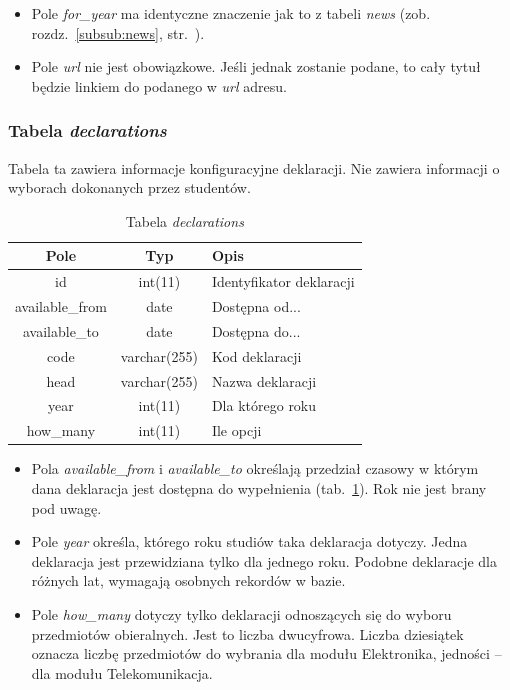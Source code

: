 \documentclass[a4paper,12pt,oneside]{report}
\begin{document}
\begin{itemize}
  \item Pole \emph{for\_year} ma identyczne znaczenie jak to z tabeli \emph{news} (zob. rozdz.~\ref{subsub:news}, str.~\pageref{subsub:news}).
  \item Pole \emph{url} nie jest obowiązkowe. Jeśli jednak zostanie podane, to cały tytuł będzie linkiem do podanego w \emph{url} adresu.
\end{itemize}

\subsubsection{Tabela \emph{declarations}}
\label{subsub:declarations}
Tabela ta zawiera informacje konfiguracyjne deklaracji. Nie zawiera informacji o wyborach dokonanych przez studentów.

\begin{table}[h]
  \centering
  \begin{tabular}{|c|c|l|}\hline
  Pole & Typ & Opis \\\hline
  id   & int(11)   & Identyfikator deklaracji\\
  available\_from & date         & Dostępna od... \\
  available\_to   & date         & Dostępna do... \\
  code            & varchar(255) & Kod deklaracji \\
  head            & varchar(255) & Nazwa deklaracji \\
  year            & int(11)      & Dla którego roku \\
  how\_many       & int(11)      & Ile opcji \\\hline

  \end{tabular}
  \caption{Tabela \emph{declarations}\label{tab:declarations}}
\end{table}

\begin{itemize}
  \item Pola \emph{available\_from} i \emph{available\_to} określają przedział czasowy w którym dana deklaracja jest dostępna do wypełnienia (tab.~\ref{tab:declarations}). Rok nie jest brany pod uwagę.
  \item Pole \emph{year} określa, którego roku studiów taka deklaracja dotyczy. Jedna deklaracja jest przewidziana tylko dla jednego roku. Podobne deklaracje dla różnych lat, wymagają osobnych rekordów w bazie.
  \item Pole \emph{how\_many} dotyczy tylko deklaracji odnoszących się do wyboru przedmiotów obieralnych. Jest to liczba dwucyfrowa. Liczba dziesiątek oznacza liczbę przedmiotów do wybrania dla modułu Elektronika, jedności -- dla modułu Telekomunikacja.
\end{itemize}
\end{document}
